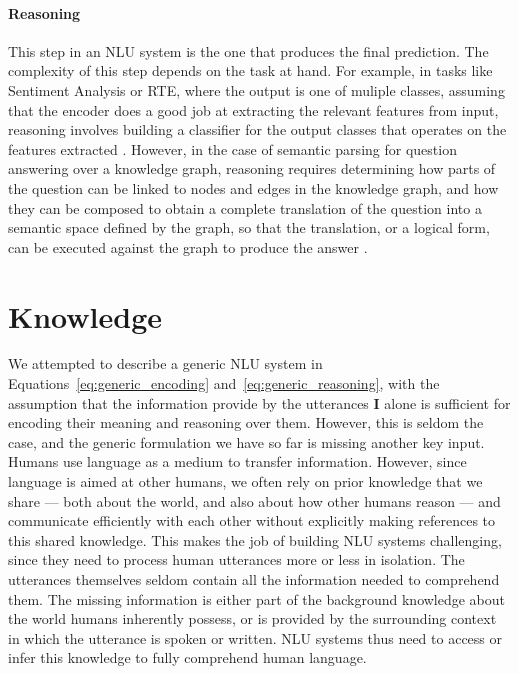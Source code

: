 \paragraph{Reasoning} This step in an NLU system is the one that produces the final prediction. The
complexity of this step depends on the task at hand.  For example, in tasks like Sentiment Analysis
or RTE, where the output is one of muliple classes, assuming that the encoder does a good job at
extracting the relevant features from input, reasoning involves building a classifier for the output
classes that operates on the features extracted \citep{pang2002thumbs}. However, in the case of
semantic parsing for question answering over a knowledge graph, reasoning requires determining how
parts of the question can be linked to nodes and edges in the knowledge graph, and how they can be
composed to obtain a complete translation of the question into a semantic space defined by the
graph, so that the translation, or a logical form, can be executed against the graph to produce the
answer \citep{Zettlemoyer2005LearningTM}.

\section{Knowledge}\label{sec:intro_external_knowledge} We attempted to describe a generic NLU
system in Equations~\ref{eq:generic_encoding} and~\ref{eq:generic_reasoning}, with the assumption
that the information provide by the utterances $\textbf{I}$ alone is sufficient for encoding their
meaning and reasoning over them. However, this is seldom the case, and the generic formulation we
have so far is missing another key input.  Humans use language as a medium to transfer information.
However, since language is aimed at other humans, we often rely on prior knowledge that we share ---
both about the world, and also about how other humans reason --- and communicate efficiently with
each other without explicitly making references to this shared knowledge. This makes the job of
building NLU systems challenging, since they need to process human utterances more or less in
isolation. The utterances themselves seldom contain all the information needed to comprehend them.
The missing information is either part of the background knowledge about the world humans inherently
possess, or is provided by the surrounding context in which the utterance is spoken or written. NLU
systems thus need to access or infer this knowledge to fully comprehend human language.

